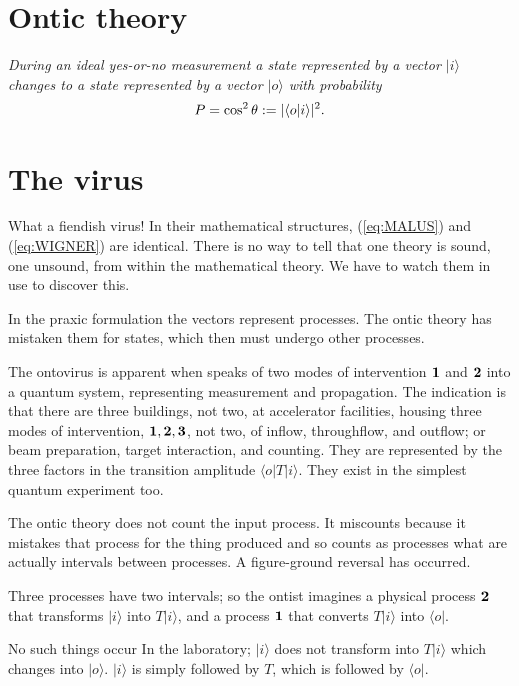 \documentclass[a4paper,11pt]{article}
\begin{document}
\section{Ontic theory}

{\em During an ideal yes-or-no measurement 
a state represented
by a vector $|i\rangle$
changes 
to a state represented by a vector $|o\rangle$
with probability}
\begin{equation}
\label{eq:WIGNER}
P=\cos^2 \theta := |\langle o |i\rangle|^2\/.
\end{equation}

\section{The virus}

What a fiendish virus!
In their mathematical structures,
 (\ref{eq:MALUS}) and (\ref{eq:WIGNER})
are identical. 
There is no way to tell that one 
theory is sound, one unsound,
from within the mathematical theory.
We have to watch them in use to discover this.

In the praxic formulation the vectors represent
processes.
The ontic theory has mistaken them for 
states,
which then must undergo other processes.

The ontovirus is apparent
when \cite{NEUMANN}
speaks of two modes of intervention
${\bf 1}$ and ${\bf 2}$
into a quantum system,
representing  measurement and propagation.
The indication is that
there are three buildings, not two,
at accelerator facilities,
housing three modes of intervention,
${\bf 1, 2, 3}$,
not two,
 of
inflow, throughflow, and outflow;
or beam preparation,
target interaction,
and counting.
They are represented by the three factors
in the transition amplitude
$\langle o | T| i\rangle$.
They  exist in the simplest quantum experiment too.

The ontic
theory does not count the input process.
It miscounts because
it mistakes that process for the thing produced
and so counts as processes  
what are actually
intervals between processes.
A figure-ground reversal 
has occurred.

Three processes have two intervals;
so the ontist imagines a physical process $\bf 2$
 that transforms $|i\rangle$ into
$T|i\rangle$, and a process $\bf 1$  that converts 
$T|i\rangle$ into $\langle o|$.

No such things occur In the laboratory;
$|i\rangle$ does not transform into 
$T|i\rangle$ which changes into $|o\rangle$.
$|i\rangle$ is simply followed by $T$,
which is followed by $\langle o|$.
\end{document}
